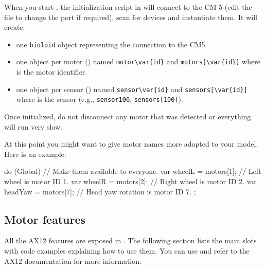 When you start \urbi, the initialization script in  will
connect to the CM-5 (edit the file to change the port if required), scan for
devices and instantiate them. It will create:

\begin{itemize}
\item one \lstinline|bioloid| object representing the connection to the CM5.
\item one object per motor () named
  \lstinline|motor\var{id}| and \lstinline|motors[\var{id}]| where 
  is the motor identifier.
\item one object per sensor () named
  \lstinline|sensor\var{id}| and \lstinline|sensors[\var{id}]| where
   is the sensor  (e.g., \lstinline|sensor100|,
  \lstinline|sensors[100]|).
\end{itemize}

Once initialized, do not disconnect any motor that was detected or
everything will run very slow.

At this point you might want to give motor names more adapted to your model.
Here is an example:

\begin{urbiunchecked}
do (Global) // Make them available to everyone.
{
  var wheelL = motors[1];  // Left wheel is motor ID 1.
  var wheelR = motors[2];  // Right wheel is motor ID 2.
  var headYaw = motors[7]; // Head yaw rotation is motor ID 7.
};
\end{urbiunchecked}


\subsection{Motor features}
\def\currentObject{AX12}

All the AX12 features are exposed in \us. The following section lists
the main slots with code examples explaining how to use them. You can use
 and refer to the AX12 documentation for
more information.


